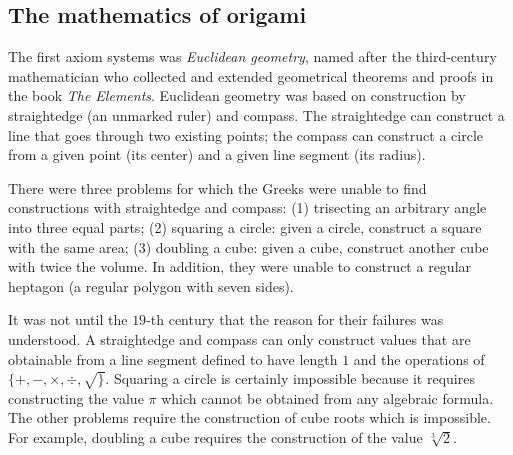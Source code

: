 \begin{center}
\end{center}


\subsection{The mathematics of origami}

The first axiom systems was \emph{Euclidean geometry}, named after the third-century mathematician who collected and extended geometrical theorems and proofs in the book \emph{The Elements}. Euclidean geometry was based on construction by straightedge (an unmarked ruler) and compass. The straightedge can construct a line that goes through two existing points; the compass can construct a circle from a given point (its center) and a given line segment (its radius).

There were three problems for which the Greeks were unable to find constructions with straightedge and compass: (1) trisecting an arbitrary angle into three equal parts; (2) squaring a circle: given a circle, construct a square with the same area; (3) doubling a cube: given a cube, construct another cube with twice the volume. In addition, they were unable to construct a regular heptagon (a regular polygon with seven sides).

It was not until the $19$-th century that the reason for their failures was understood. A straightedge and compass can only construct values that are obtainable from a line segment defined to have length $1$ and the operations of $\{+,-,\times, \div,\surd\}$. Squaring a circle is certainly impossible because it requires constructing the value $\pi$ which cannot be obtained from any algebraic formula. The other problems require the construction of cube roots which is impossible. For example, doubling a cube requires the construction of the value $\sqrt[3]{2}$.

